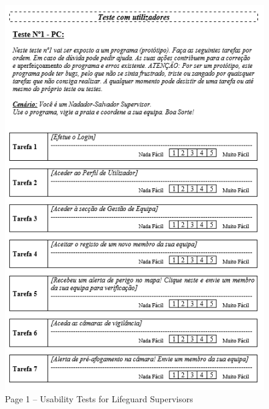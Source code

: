 \begin{figure}[H]
  \centering
  \includegraphics[width=14cm]{figs/UsabilityTest_Supervisor_1.png}
  \caption{Page 1 – Usability Tests for Lifeguard Supervisors}
  \label{fig:UsabilityTest_Supervisor_1}
\end{figure}
